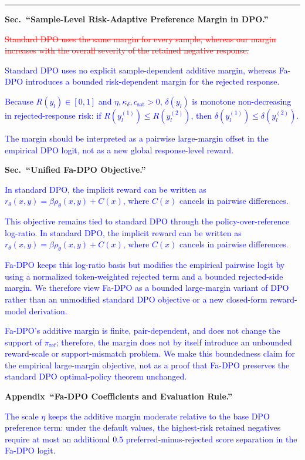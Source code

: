 \documentclass[12pt]{article}
\newcommand{\deleted}[1]{\textcolor{red}{\sout{#1}}}
\newcommand{\added}[1]{\textcolor{blue}{#1}}
\newcommand{\responseheading}[1]{%
    \vspace{0.24cm}
    \par\noindent{\large\bfseries #1}\par
    \vspace{0.03cm}
    \noindent\rule{\linewidth}{0.35pt}\par
    \vspace{0.06cm}
    \noindent\ignorespaces
}
\begin{document}
\responseheading{Revision Details}
\textbf{Sec.~``Sample-Level Risk-Adaptive Preference Margin in DPO.''}
\begin{displayquote}
\deleted{Standard DPO uses the same margin for every sample, whereas our margin increases with the overall severity of the retained negative response.}

\added{Standard DPO uses no explicit sample-dependent additive margin, whereas Fa-DPO introduces a bounded risk-dependent margin for the rejected response.}

\added{Because $R(y_l)\in[0,1]$ and $\eta,\kappa_{\delta},c_{\text{sat}}>0$, $\delta(y_l)$ is monotone non-decreasing in rejected-response risk: if $R(y_l^{(1)})\le R(y_l^{(2)})$, then $\delta(y_l^{(1)})\le\delta(y_l^{(2)})$.}

\added{The margin should be interpreted as a pairwise large-margin offset in the empirical DPO logit, not as a new global response-level reward.}
\end{displayquote}

\textbf{Sec.~``Unified Fa-DPO Objective.''}
\begin{displayquote}
\added{In standard DPO, the implicit reward can be written as $r_\theta(x,y)=\beta\rho_\theta(x,y)+C(x)$, where $C(x)$ cancels in pairwise differences.}

\added{This objective remains tied to standard DPO through the policy-over-reference log-ratio. In standard DPO, the implicit reward can be written as $r_\theta(x,y)=\beta\rho_\theta(x,y)+C(x)$, where $C(x)$ cancels in pairwise differences.}

\added{Fa-DPO keeps this log-ratio basis but modifies the empirical pairwise logit by using a normalized token-weighted rejected term and a bounded rejected-side margin. We therefore view Fa-DPO as a bounded large-margin variant of DPO rather than an unmodified standard DPO objective or a new closed-form reward-model derivation.}

\added{Fa-DPO's additive margin is finite, pair-dependent, and does not change the support of $\pi_{\mathrm{ref}}$; therefore, the margin does not by itself introduce an unbounded reward-scale or support-mismatch problem. We make this boundedness claim for the empirical large-margin objective, not as a proof that Fa-DPO preserves the standard DPO optimal-policy theorem unchanged.}
\end{displayquote}

\textbf{Appendix~``Fa-DPO Coefficients and Evaluation Rule.''}
\begin{displayquote}
\added{The scale $\eta$ keeps the additive margin moderate relative to the base DPO preference term: under the default values, the highest-risk retained negatives require at most an additional $0.5$ preferred-minus-rejected score separation in the Fa-DPO logit.}
\end{displayquote}
\end{document}
